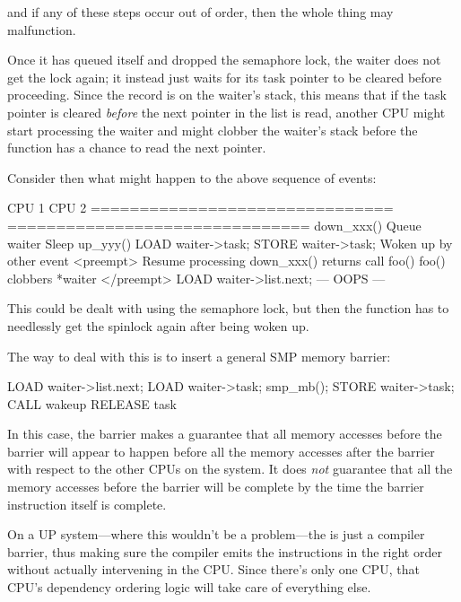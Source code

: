 \noindent%
and if any of these steps occur out of order, then the whole thing may
malfunction.

Once it has queued itself and dropped the semaphore lock, the waiter does not
get the lock again; it instead just waits for its task pointer to be cleared
before proceeding.
Since the record is on the waiter's stack, this means that if the task
pointer is cleared \emph{before} the next pointer in the list is read,
another CPU might start processing the waiter and might clobber the waiter's
stack before the  function has a chance to read the next pointer.

Consider then what might happen to the above sequence of events:

\begin{VerbatimU}
	CPU 1                           CPU 2
	===============================	===============================
	                                down_xxx()
	                                Queue waiter
	                                Sleep
	up_yyy()
	LOAD waiter->task;
	STORE waiter->task;
	                                Woken up by other event
	<preempt>
	                                Resume processing
	                                down_xxx() returns
	                                call foo()
	                                foo() clobbers *waiter
	</preempt>
	LOAD waiter->list.next;
	--- OOPS ---
\end{VerbatimU}

This could be dealt with using the semaphore lock, but then the 
function has to needlessly get the spinlock again after being woken up.

The way to deal with this is to insert a general SMP memory barrier:

\begin{VerbatimU}
	LOAD waiter->list.next;
	LOAD waiter->task;
	smp_mb();
	STORE waiter->task;
	CALL wakeup
	RELEASE task
\end{VerbatimU}

In this case, the barrier makes a guarantee that all memory accesses before the
barrier will appear to happen before all the memory accesses after the barrier
with respect to the other CPUs on the system.
It does \emph{not} guarantee that all the memory accesses before the barrier
will be complete by the time the barrier instruction itself is complete.

On a UP system---where this wouldn't be a problem---the  is just a
compiler barrier, thus making sure the compiler emits the instructions in the
right order without actually intervening in the CPU.
Since there's only one CPU, that CPU's dependency ordering logic will take
care of everything else.

